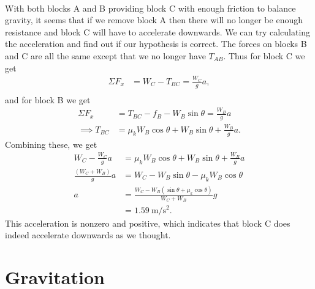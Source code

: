 \documentclass[../classical_mechanics.tex]{subfiles}
\begin{document}
\begin{example}
            \paragraph{}
            With both blocks A and B providing block C with enough friction to balance gravity, it seems that if we remove block A then there will no longer be enough resistance and block C will have to accelerate downwards.
            We can try calculating the acceleration and find out if our hypothesis is correct.
            The forces on blocks B and C are all the same except that we no longer have $T_{AB}$.
            Thus for block C we get
            \begin{align}
                \Sigma F_x&=W_C-T_{BC}=\frac{W_C}{g}a,\\
            \end{align}
            and for block B we get
            \begin{align}
                \Sigma F_x&=T_{BC}-f_B-W_B\sin\theta=\frac{W_B}{g}a\\
                \implies T_{BC}&=\mu_k W_B\cos\theta+W_B\sin\theta+\frac{W_B}{g}a.
            \end{align}
            Combining these, we get
            \begin{align}
                W_C-\frac{W_C}{g}a&=\mu_k W_B\cos\theta+W_B\sin\theta+\frac{W_B}{g}a\\
                \frac{(W_C+W_B)}{g}a&=W_C-W_B\sin\theta-\mu_k W_B\cos\theta\\
                a&=\frac{W_C-W_B(\sin\theta+\mu_k\cos\theta)}{W_C+W_B}g\\
                &=\qty{1.59}{\metre\per\square\second}.
            \end{align}
            This acceleration is nonzero and positive, which indicates that block C does indeed accelerate downwards as we thought.
        \end{example}

    \section{Gravitation}
\end{document}
